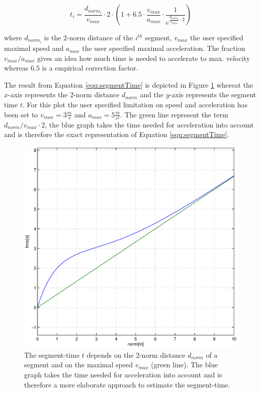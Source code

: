 \begin{equation}
t_i = \frac{d_{norm_i}}{v_{max}} \cdot 2 \cdot \left( 1 + 6.5 \cdot \frac {v_{max}}{a_{max}} \cdot \frac{1}{e^{\frac{d_{norm_i}}{v_{max}} \cdot 2}} \right)
\label{equ:segmentTime}
\end{equation}

where $d_{norm_i}$ is the 2-norm distance of the $i^{th}$ segment, $v_{max}$ the user specified maximal speed and $a_{max}$ the user specified maximal acceleration. The fraction$v_{max}/a_{max}$ gives an idea how much time is needed to accelerate to max. velocity whereas $6.5$ is a empirical correction factor. \newline

The result from Equation \ref{equ:segmentTime} is depicted in Figure \ref{pic:timeEstimation} whereat the $x$-axis represents the 2-norm distance $d_{norm}$ and the $y$-axis represents the segment time $t$. For this plot the user specified limitation on speed and acceleration has been set to $v_{max} = 3 \frac{m}{s}$ and $a_{max} = 5 \frac{m}{s^2}$. The green line represent the term $d_{norm}/v_{max} \cdot 2$, the blue graph takes the time needed for acceleration into account and is therefore the exact representation of Equation \ref{equ:segmentTime}. \newline


\begin{figure}[h]
   \centering
   \includegraphics[width=1\textwidth]{pics/time_estimation.eps}
   \caption{The segment-time $t$ depends on the 2-norm distance $d_{norm}$ of a segment and on the maximal speed $v_{max}$ (green line). The blue graph takes  the time needed for acceleration into account and is therefore a more elaborate approach to estimate the segment-time.}
   \label{pic:timeEstimation}
\end{figure}

